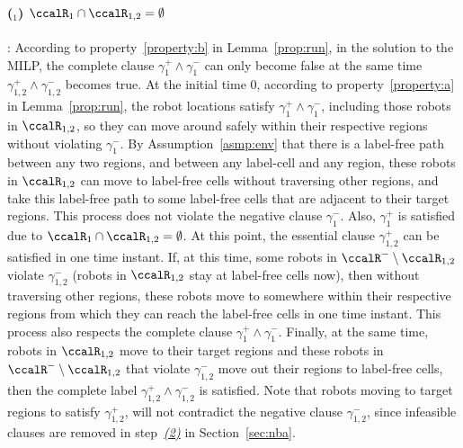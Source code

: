 \documentclass[Afour,sageh,times]{sagej}
\newcounter{mycounter}
\begin{document}
{\paragraph{ ($_1$) $\ccalR_1 \cap \ccalR_{1,2} = \emptyset$}\label{app:gmrpp_a}: According to property~\ref{property:b} in Lemma~\ref{prop:run}, in the solution to the MILP, the complete clause $\gamma_1^+ \wedge \gamma_1^-$ can only become false at the same time $\gamma_{1,2}^+ \wedge \gamma_{1,2}^-$ becomes true. At the initial time 0, according  to property~\ref{property:a} in Lemma~\ref{prop:run}, the robot locations satisfy $\gamma_1^+ \wedge \gamma_1^-$, including those robots in $\ccalR_{1,2}$, so  they can move around safely  within their respective regions without violating $\gamma_1^-$. By Assumption~\ref{asmp:env} that there is a label-free path between any two regions, and between any label-cell and any region, these robots in $\ccalR_{1,2}$ can move to label-free cells without traversing other regions, and take this label-free path to  some label-free cells that are adjacent to their target regions. This process does not  violate  the negative clause $\gamma_1^-$. Also, $\gamma_1^+$ is satisfied due to $\ccalR_1 \cap \ccalR_{1,2} = \emptyset$. At this point, the essential clause $\gamma_{1,2}^+$ can be satisfied in one  time instant. If, at this time, some robots in $\ccalR^-\setminus \ccalR_{1,2}$ violate $\gamma_{1,2}^-$ (robots in $\ccalR_{1,2}$ stay at label-free cells now), then without traversing other regions, these robots  move to somewhere within their respective regions from which they can reach the label-free cells in one time instant. This process also respects the complete clause $\gamma_1^+ \wedge \gamma_1^-$. Finally, at the same time, robots in $\ccalR_{1,2}$ move to their target regions and these robots in $\ccalR^-\setminus \ccalR_{1,2}$ that violate $\gamma_{1,2}^-$   move out their regions to label-free cells, then the complete label $\gamma_{1,2}^+ \wedge \gamma_{1,2}^-$ is satisfied. Note that robots moving to target regions to satisfy $\gamma_{1,2}^+$, will not contradict the negative clause $\gamma_{1,2}^-$, since infeasible clauses are removed in step~\hyperref[prune:exclusion2]{\it (2)} in Section~\ref{sec:nba}.


}
\end{document}
